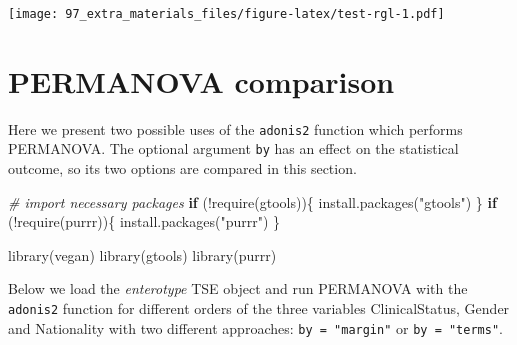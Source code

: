 \documentclass[
]{book}
\newenvironment{Shaded}{\begin{snugshade}}{\end{snugshade}}
\newcommand{\CommentTok}[1]{\textcolor[rgb]{0.56,0.35,0.01}{\textit{#1}}}
\newcommand{\ControlFlowTok}[1]{\textcolor[rgb]{0.13,0.29,0.53}{\textbf{#1}}}
\newcommand{\FunctionTok}[1]{\textcolor[rgb]{0.00,0.00,0.00}{#1}}
\newcommand{\NormalTok}[1]{#1}
\newcommand{\SpecialCharTok}[1]{\textcolor[rgb]{0.00,0.00,0.00}{#1}}
\newcommand{\StringTok}[1]{\textcolor[rgb]{0.31,0.60,0.02}{#1}}
\begin{document}
\texttt{[image: 97\_extra\_materials\_files/figure-latex/test-rgl-1.pdf]}

\hypertarget{permanova-comparison}{%
\section{PERMANOVA comparison}\label{permanova-comparison}}

Here we present two possible uses of the \texttt{adonis2} function which performs PERMANOVA. The
optional argument \texttt{by} has an effect on the statistical outcome, so its two options are
compared in this section.

\begin{Shaded}
\begin{Highlighting}[]
\CommentTok{\# import necessary packages}
\ControlFlowTok{if}\NormalTok{ (}\SpecialCharTok{!}\FunctionTok{require}\NormalTok{(gtools))\{}
  \FunctionTok{install.packages}\NormalTok{(}\StringTok{"gtools"}\NormalTok{)  }
\NormalTok{\}}
\ControlFlowTok{if}\NormalTok{ (}\SpecialCharTok{!}\FunctionTok{require}\NormalTok{(purrr))\{}
  \FunctionTok{install.packages}\NormalTok{(}\StringTok{"purrr"}\NormalTok{)  }
\NormalTok{\}}

\FunctionTok{library}\NormalTok{(vegan)}
\FunctionTok{library}\NormalTok{(gtools)}
\FunctionTok{library}\NormalTok{(purrr)}
\end{Highlighting}
\end{Shaded}

Below we load the \emph{enterotype} TSE object and run PERMANOVA with the \texttt{adonis2} function
for different orders of the three variables ClinicalStatus, Gender and Nationality with
two different approaches: \texttt{by\ =\ "margin"} or \texttt{by\ =\ "terms"}.
\end{document}
